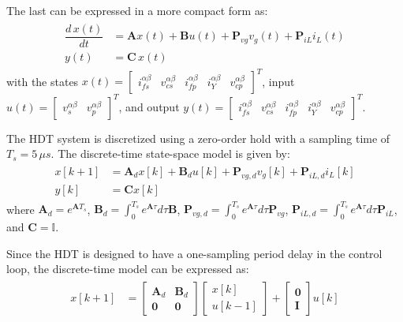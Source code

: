 The last can be expressed in a more compact form as:
\begin{align}
    \begin{aligned}
        \dfrac{d\, x(t)}{dt} &= \mathbf{A}x(t) + \mathbf{B}u(t) + \mathbf{P}_{vg}v_g(t) + \mathbf{P}_{iL}i_L(t)\\
        y(t) &= \mathbf{C}\,x(t)
    \end{aligned}
\end{align}
with the states $x(t) = \begin{bmatrix} i_{fs}^{\alpha\beta} & v_{cs}^{\alpha\beta} & i_{fp}^{\alpha\beta} & i_{Y}^{\alpha\beta} & v_{cp}^{\alpha\beta} \end{bmatrix}^T$, input $u(t) = \begin{bmatrix} v_s^{\alpha\beta} & v_p^{\alpha\beta} \end{bmatrix}^T$, and output \linebreak $y(t) = \begin{bmatrix} i_{fs}^{\alpha\beta} & v_{cs}^{\alpha\beta} & i_{fp}^{\alpha\beta} & i_{Y}^{\alpha\beta} & v_{cp}^{\alpha\beta} \end{bmatrix}^T$.

The HDT system is discretized using a zero-order hold with a sampling time of $T_s = 5\,\mu s$. The discrete-time state-space model is given by:
\begin{align}
    \begin{aligned}
        x[k+1] &= \mathbf{A}_d x[k] + \mathbf{B}_d u[k] + \mathbf{P}_{vg,d} v_g[k] + \mathbf{P}_{iL,d} i_L[k]\\
        y[k] &= \mathbf{C} x[k]
    \end{aligned}
\end{align}
where $\mathbf{A}_d = e^{\mathbf{A}T_s}$, $\mathbf{B}_d = \int_0^{T_s} e^{\mathbf{A}\tau} d\tau \mathbf{B}$, $\mathbf{P}_{vg,d} = \int_0^{T_s} e^{\mathbf{A}\tau} d\tau \mathbf{P}_{vg}$, $\mathbf{P}_{iL,d} = \int_0^{T_s} e^{\mathbf{A}\tau} d\tau \mathbf{P}_{iL}$, and $\mathbf{C} = \mathbb{I}$.

Since the HDT is designed to have a one-sampling period delay in the control loop, the discrete-time model can be expressed as:
\begin{align}
    \begin{aligned}
        x[k+1] &=
        \begin{bmatrix}
            \mathbf{A}_d & \mathbf{B}_d \\
            \mathbf{0} & \mathbf{0}
        \end{bmatrix}
        \begin{bmatrix}
            x[k]\\
            u[k-1]
        \end{bmatrix}
        +
        \begin{bmatrix}
            \mathbf{0}\\
            \mathbf{I}
        \end{bmatrix}
        u[k]
    \end{aligned}
\end{align}